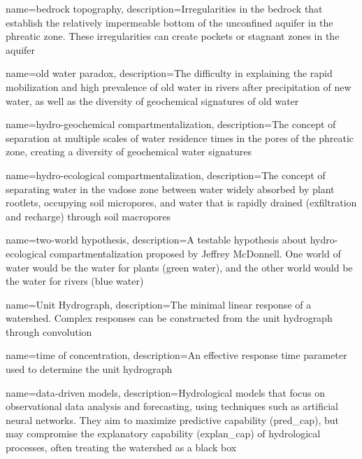 {
    name=bedrock topography,
    description={Irregularities in the bedrock that establish the relatively impermeable bottom of the unconfined aquifer in the phreatic zone. These irregularities can create pockets or stagnant zones in the aquifer}
}

{
    name=old water paradox,
    description={The difficulty in explaining the rapid mobilization and high prevalence of old water in rivers after precipitation of new water, as well as the diversity of geochemical signatures of old water}
}

{
    name=hydro-geochemical compartmentalization,
    description={The concept of separation at multiple scales of water residence times in the pores of the phreatic zone, creating a diversity of geochemical water signatures}
}

{
    name=hydro-ecological compartmentalization,
    description={The concept of separating water in the vadose zone between water widely absorbed by plant rootlets, occupying soil micropores, and water that is rapidly drained (exfiltration and recharge) through soil macropores}
}

{
    name=two-world hypothesis,
    description={A testable hypothesis about hydro-ecological compartmentalization proposed by Jeffrey McDonnell. One world of water would be the water for plants (green water), and the other world would be the water for rivers (blue water)}
}

{
    name=Unit Hydrograph,
    description={The minimal linear response of a watershed. Complex responses can be constructed from the unit hydrograph through convolution}
}

{
    name=time of concentration,
    description={An effective response time parameter used to determine the unit hydrograph}
}

{
    name=data-driven models,
    description={Hydrological models that focus on observational data analysis and forecasting, using techniques such as artificial neural networks. They aim to maximize predictive capability (\gls{pred_cap}), but may compromise the explanatory capability (\gls{explan_cap}) of hydrological processes, often treating the watershed as a black box}
}

